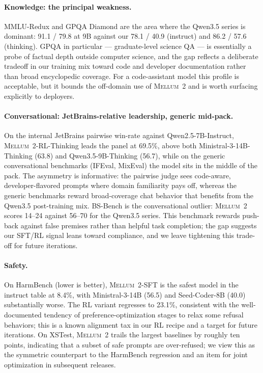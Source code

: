 \documentclass{llmxive}
\providecommand{\modelname}{\textsc{Mellum~2}\xspace}
\begin{document}
\paragraph{Knowledge: the principal weakness.}
MMLU-Redux and GPQA Diamond are the area where the Qwen3.5 series is
dominant: 91.1 / 79.8 at 9B against our 78.1 / 40.9 (instruct) and
86.2 / 57.6 (thinking). GPQA in particular --- graduate-level science
QA --- is essentially a probe of factual depth outside computer
science, and the gap reflects a deliberate tradeoff in our training
mix toward code and developer documentation rather than broad
encyclopedic coverage. For a code-assistant model this profile is
acceptable, but it bounds the off-domain use of \modelname and is
worth surfacing explicitly to deployers.

\paragraph{Conversational: JetBrains-relative leadership, generic mid-pack.}
On the internal JetBrains pairwise win-rate against
Qwen2.5-7B-Instruct, \modelname-RL-Thinking leads the panel at 69.5\%,
above both Ministral-3-14B-Thinking (63.8) and Qwen3.5-9B-Thinking
(56.7), while on the generic conversational benchmarks (IFEval,
MixEval) the model sits in the middle of the pack. The asymmetry is
informative: the pairwise judge sees code-aware, developer-flavored
prompts where domain familiarity pays off, whereas the generic
benchmarks reward broad-coverage chat behavior that benefits from the
Qwen3.5 post-training mix. BS-Bench is the conversational outlier:
\modelname scores 14--24 against 56--70 for the Qwen3.5 series. This
benchmark rewards push-back against false premises rather than helpful
task completion; the gap suggests our SFT/RL signal leans toward
compliance, and we leave tightening this trade-off for future
iterations.

\paragraph{Safety.}
On HarmBench (lower is better), \modelname-SFT is the safest model in
the instruct table at 8.4\%, with Ministral-3-14B (56.5) and
Seed-Coder-8B (40.0) substantially worse. The RL variant regresses to
23.1\%, consistent with the well-documented tendency of
preference-optimization stages to relax some refusal behaviors;
this is a known alignment tax in our RL recipe and a target for
future iterations. On
XSTest, \modelname trails the largest baselines by roughly ten points,
indicating that a subset of safe prompts are over-refused; we view
this as the symmetric counterpart to the HarmBench regression and an
item for joint optimization in subsequent releases.
\end{document}

